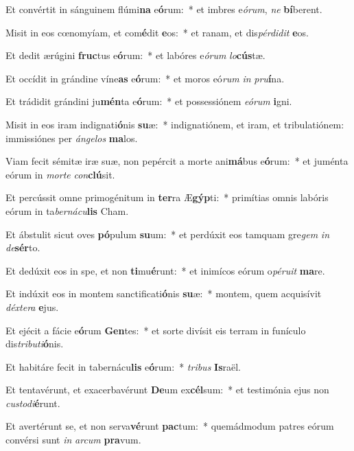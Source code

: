 \item Et convértit in sánguinem flúmi\textbf{na} e\textbf{ó}rum:~* et imbres e\textit{ó}\textit{rum}, \textit{ne} \textbf{bí}berent.
\item Misit in eos cœnomyíam, et com\textbf{é}dit \textbf{e}os:~* et ranam, et dis\textit{pér}\textit{di}\textit{dit} \textbf{e}os.
\item Et dedit ærúgini \textbf{fruc}tus e\textbf{ó}rum:~* et labóres e\textit{ó}\textit{rum} \textit{lo}\textbf{cús}tæ.
\item Et occídit in grándine víne\textbf{as} e\textbf{ó}rum:~* et moros eó\textit{rum} \textit{in} \textit{pru}\textbf{í}na.
\item Et trádidit grándini ju\textbf{mén}ta e\textbf{ó}rum:~* et possessiónem \textit{e}\textit{ó}\textit{rum} \textbf{i}gni.
\item Misit in eos iram indignati\textbf{ó}nis \textbf{su}æ:~* indignatiónem, et iram, et tribulatiónem: immissiónes per \textit{án}\textit{ge}\textit{los} \textbf{ma}los.
\item Viam fecit sémitæ iræ suæ, non pepércit a morte ani\textbf{má}bus e\textbf{ó}rum:~* et juménta eórum in \textit{mor}\textit{te} \textit{con}\textbf{clú}sit.
\item Et percússit omne primogénitum in \textbf{ter}ra Æ\textbf{gýp}ti:~* primítias omnis labóris eórum in ta\textit{ber}\textit{ná}\textit{cu}\textbf{lis} Cham.
\item Et ábstulit sicut oves \textbf{pó}pulum \textbf{su}um:~* et perdúxit eos tamquam gre\textit{gem} \textit{in} \textit{de}\textbf{sér}to.
\item Et dedúxit eos in spe, et non \textbf{ti}mu\textbf{é}runt:~* et inimícos eórum o\textit{pé}\textit{ru}\textit{it} \textbf{ma}re.
\item Et indúxit eos in montem sanctificati\textbf{ó}nis \textbf{su}æ:~* montem, quem acquisívit \textit{déx}\textit{te}\textit{ra} \textbf{e}jus.
\item Et ejécit a fácie e\textbf{ó}rum \textbf{Gen}tes:~* et sorte divísit eis terram in funículo dis\textit{tri}\textit{bu}\textit{ti}\textbf{ó}nis.
\item Et habitáre fecit in tabernácu\textbf{lis} e\textbf{ó}rum:~* \textit{tri}\textit{bus} \textbf{Is}raël.
\item Et tentavérunt, et exacerbavérunt \textbf{De}um ex\textbf{cél}sum:~* et testimónia ejus non \textit{cus}\textit{to}\textit{di}\textbf{é}runt.
\item Et avertérunt se, et non serva\textbf{vé}runt \textbf{pac}tum:~* quemádmodum patres eórum convérsi sunt \textit{in} \textit{ar}\textit{cum} \textbf{pra}vum.
